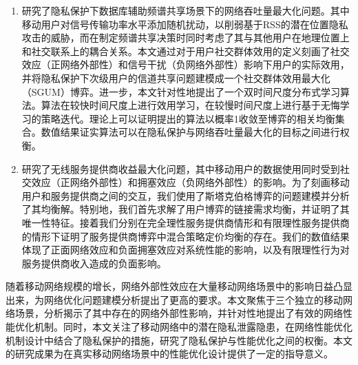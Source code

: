 \begin{enumerate}
   \item 研究了隐私保护下数据库辅助频谱共享场景下的网络吞吐量最大化问题。其中移动用户对信号传输功率水平添加随机扰动，以削弱基于RSS的潜在位置隐私攻击的威胁，而在制定频谱共享决策时同时考虑了其与其他用户在地理位置上和社交联系上的耦合关系。本文通过对于用户社交群体效用的定义刻画了社交效应（正网络外部性）和信号干扰（负网络外部性）影响下用户的实际效用，并将隐私保护下次级用户的信道共享问题建模成一个社交群体效用最大化（SGUM）博弈。进一步，本文针对性地提出了一个双时间尺度分布式学习算法。算法在较快时间尺度上进行效用学习，在较慢时间尺度上进行基于无悔学习的策略迭代。理论上可以证明提出的算法以概率1收敛至博弈的相关均衡集合。数值结果证实算法可以在隐私保护与网络吞吐量最大化的目标之间进行权衡。
   
  \item 研究了无线服务提供商收益最大化问题，其中移动用户的数据使用同时受到社交效应（正网络外部性）和拥塞效应（负网络外部性）的影响。为了刻画移动用户和服务提供商之间的交互，我们使用了斯塔克伯格博弈的问题建模并分析了其均衡解。特别地，我们首先求解了用户博弈的链接需求均衡，并证明了其唯一性特征。接着我们分别在完全理性服务提供商情形和有限理性服务提供商的情形下证明了服务提供商博弈中混合策略定价均衡的存在。我们的数值结果体现了正面网络效应和负面拥塞效应对系统性能的影响，以及有限理性行为对服务提供商收入造成的负面影响。
     
\end{enumerate}

随着移动网络规模的增长，网络外部性效应在大量移动网络场景中的影响日益凸显出来，为网络优化问题建模分析提出了更高的要求。本文聚焦于三个独立的移动网络场景，分析揭示了其中存在的网络外部性影响，并针对性地提出了有效的网络性能优化机制。同时，本文关注了移动网络中的潜在隐私泄露隐患，在网络性能优化机制设计中结合了隐私保护的措施，研究了隐私保护与性能优化之间的权衡。本文的研究成果为在真实移动网络场景中的性能优化设计提供了一定的指导意义。

